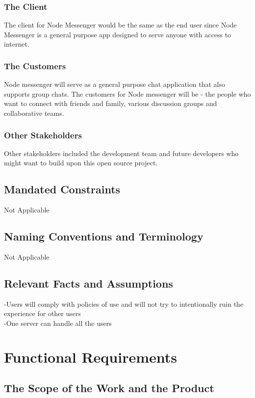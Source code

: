 \documentclass[12pt, titlepage]{article}
\begin{document}
    		\subsubsection{The Client}
            The client for Node Messenger would be the same as the end user since Node Messenger is a general purpose app designed to serve anyone with access to internet.
    		\subsubsection{The Customers}
    		Node messenger will serve as a general purpose chat application that also supports group chats. The customers for Node messenger will be - the people who want to connect with friends and family, various discussion groups and collaborative teams.


    		\subsubsection{Other Stakeholders}
    		 Other stakeholders included the development team and future developers who might want to build upon this open source project.

    	\subsection{Mandated Constraints}
    Not Applicable
    	\subsection{Naming Conventions and Terminology}
Not Applicable
    	\subsection{Relevant Facts and Assumptions}

    	-Users will comply with policies of use and will not try to intentionally ruin the experience for other users\\
    	-One server can handle all the users
	
	\newpage
    \section{Functional Requirements}

    	\subsection{The Scope of the Work and the Product}
\end{document}
